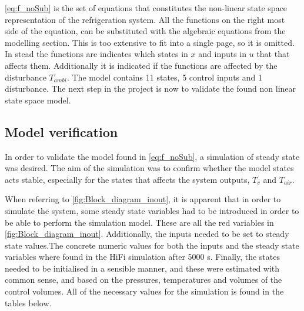 \cref{eq:f_noSub} is the set of equations that constitutes the non-linear state space representation of the refrigeration system. All the functions on the right most side of the equation, can be substituted with the algebraic equations from the modelling section. This is too extensive to fit into a single page, so it is omitted. In stead the functions are indicates which states in $ x $ and inputs in $ u $ that that affects them. Additionally it is indicated if the functions are affected by the disturbance $ T_{ambi} $. The model contains 11 states, 5 control inputs and 1 disturbance. The next step in the project is now to validate the found non linear state space model.

\newpage
\subsection{Model verification}
In order to validate the model found in \cref{eq:f_noSub}, a simulation of steady state was desired. The aim of the simulation was to confirm whether the model states acts stable, especially for the states that affects the system outputs, $T_v$ and $T_{air}$.

When referring to \cref{fig:Block_diagram_inout}, it is apparent that in order to simulate the system, some steady state variables had to be introduced in order to be able to perform the simulation model. These are all the red variables in \cref{fig:Block_diagram_inout}. Additionally, the inputs needed to be set to steady state values.The concrete numeric values for both the inputs and the steady state variables where found in the HiFi simulation after 5000 s. Finally, the states needed to be initialised in a sensible manner, and these were estimated with common sense, and based on the pressures, temperatures and volumes of the control volumes. All of the necessary values for the simulation is found in the tables below. \\


